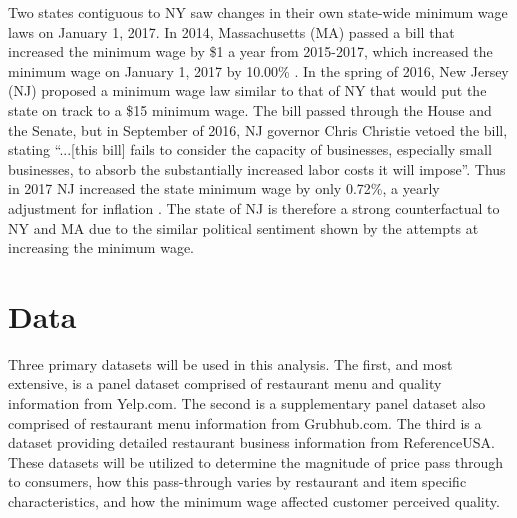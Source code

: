 \documentclass[11pt]{article}
\begin{document}
Two states contiguous to NY saw changes in their own state-wide minimum wage laws on January 1, 2017. %
In 2014, Massachusetts (MA) passed a bill that increased the minimum wage by \$1 a year from 2015-2017, which increased the minimum wage on January 1, 2017 by 10.00\% \cite{mabill}. %
In the spring of 2016, New Jersey (NJ) proposed a minimum wage law similar to that of NY that would put the state on track to a \$15 minimum wage. The bill passed through the House and the Senate, but in September of 2016, NJ governor  Chris Christie vetoed the bill, stating ``...[this bill] fails to consider the capacity of businesses, especially small businesses, to absorb the substantially increased labor costs it will impose''\cite{njveto}. Thus in 2017 NJ increased the state minimum wage by only 0.72\%, a yearly adjustment for inflation \cite{njbill}. %
The state of NJ is therefore a strong counterfactual to NY and MA due to the similar political sentiment shown by the attempts at increasing the minimum wage. 




\section{Data}

Three primary datasets will be used in this analysis. The first, and most extensive,  is a panel dataset comprised of restaurant menu  and quality information from Yelp.com. The second is a supplementary panel dataset also comprised of restaurant menu information from Grubhub.com.  The third is a dataset providing detailed restaurant business information from ReferenceUSA. These datasets will be utilized to determine the magnitude of price pass through to consumers, how this pass-through varies by restaurant and item specific characteristics, and how the minimum wage affected customer perceived quality.
\end{document}
